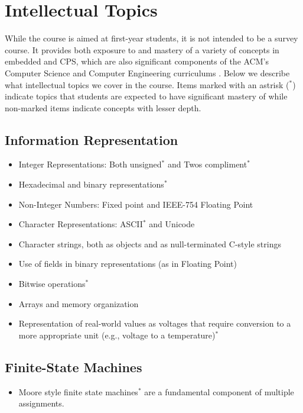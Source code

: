 \section{Intellectual Topics}
\label{sec:topics}

While the course is aimed at first-year students, it is not intended to be a survey course.  It provides both exposure to and mastery of a variety of concepts in embedded and CPS, which are also significant components of the ACM's Computer Science and Computer Engineering curriculums \cite{cs13, ce16}.  Below we describe what intellectual topics we cover in the course.  Items marked with an astrisk ($^*$)   indicate topics that students are expected to have significant mastery of while non-marked items indicate concepts with lesser depth.

\subsection{Information Representation}
\label{sec:ip}
\begin{itemize}
  \item Integer Representations: Both unsigned$^*$ and Twos compliment$^*$
  \item Hexadecimal and binary representations$^*$
  \item Non-Integer Numbers: Fixed point and IEEE-754 Floating Point
  \item Character Representations: ASCII$^*$ and Unicode
  \item Character strings, both as objects and as null-terminated C-style strings
  \item Use of fields in binary representations (as in Floating Point)
  \item Bitwise operations$^*$
  \item Arrays and memory organization
  \item Representation of real-world values as voltages that require conversion to a more appropriate unit (e.g., voltage to a temperature)$^*$
\end{itemize}

\subsection{Finite-State Machines}
\label{sec:fsm}
\begin{itemize}
\item Moore style finite state machines$^*$ are a fundamental component of multiple assignments.
\end{itemize}

